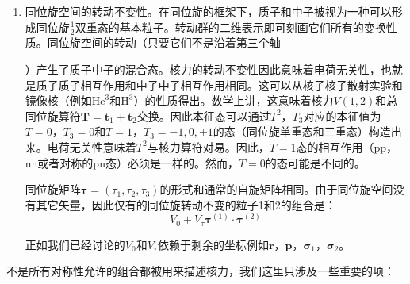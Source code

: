 \begin{enumerate}
\ref{eq:general V in spin space}中的二次项形成了一个张量，。它可以分解成一个标量$\boldsymbol{\sigma}^{(1)}\cdot\boldsymbol{\sigma}^{(2)}$，一个矢量$\boldsymbol{\sigma}^{(1)}\times\boldsymbol{\sigma}^{(2)}$，一个无迹对称张量$(\sigma^{(1)}_{i}\sigma^{(2)}_{k}+\sigma^{(1)}_{k}\sigma^{(2)}_{i})(1-\frac{1}{3}\delta_{ik})$。根据Okubo和Marshak\cite{OM58}的研究，$\boldsymbol{\sigma}^{(1)}\times\boldsymbol{\sigma}^{(2)}$不能出现，所有可能的组合是：
\[
\boldsymbol{\sigma}^{(1)}\cdot\boldsymbol{\sigma}^{(2)},(\boldsymbol{r}\cdot\boldsymbol{\sigma}^{(1)})(\boldsymbol{r}\cdot\boldsymbol{\sigma}^{(2)}),(\boldsymbol{p}\cdot\boldsymbol{\sigma}^{(1)})(\boldsymbol{p}\cdot\boldsymbol{\sigma}^{(2)}),(\boldsymbol{L}\cdot\boldsymbol{\sigma}^{(2)})(\boldsymbol{L}\cdot\boldsymbol{\sigma}^{(2)})+(\boldsymbol{L}\cdot\boldsymbol{\sigma}^{(2)})(\boldsymbol{L}\cdot\boldsymbol{\sigma}^{(1)})
\]

所有这些项都可以与$r^{2}$，$p^{2}$和$L^{2}$的任意函数相乘。
\item 同位旋空间的转动不变性。在同位旋的框架下，质子和中子被视为一种可以形成同位旋$\frac{1}{2}$双重态的基本粒子。转动群的二维表示即可刻画它们所有的变换性质。同位旋空间的转动（只要它们不是沿着第三个轴

）产生了质子中子的混合态。核力的转动不变性因此意味着电荷无关性，也就是质子质子相互作用和中子中子相互作用相同。这可以从核子核子散射实验和镜像核（例如$\text{He}^{3}$和$\text{H}^{3}$）的性质得出。数学上讲，这意味着核力$V(1,2)$和总同位旋算符$\boldsymbol{T}=\boldsymbol{t}_{1}+\boldsymbol{t}_{2}$交换。因此本征态可以通过$T^{2}$，$T_{3}$对应的本征值为$T=0$，$T_{3}=0$和$T=1$，$T_{3}=-1,0,+1$的态（同位旋单重态和三重态）构造出来。电荷无关性意味着$T^{2}$与核力算符对易。因此，$T=1$态的相互作用（pp，nn或者对称的pn态）必须是一样的。然而，$T=0$的态可能是不同的。

同位旋矩阵$\boldsymbol{\tau}=(\tau_{1},\tau_{2},\tau_{3})$的形式和通常的自旋矩阵相同。由于同位旋空间没有其它矢量，因此仅有的同位旋转动不变的粒子1和2的组合是：
\[
V_{0}+V_{\tau}\boldsymbol{\tau}^{(1)}\cdot\boldsymbol{\tau}^{(2)}
\]

正如我们已经讨论的$V_{0}$和$V_{\tau}$依赖于剩余的坐标例如$\boldsymbol{r}$，$\boldsymbol{p}$，$\boldsymbol{\sigma}_{1}$，$\boldsymbol{\sigma}_{2}$。
\end{enumerate}
不是所有对称性允许的组合都被用来描述核力，我们这里只涉及一些重要的项：
